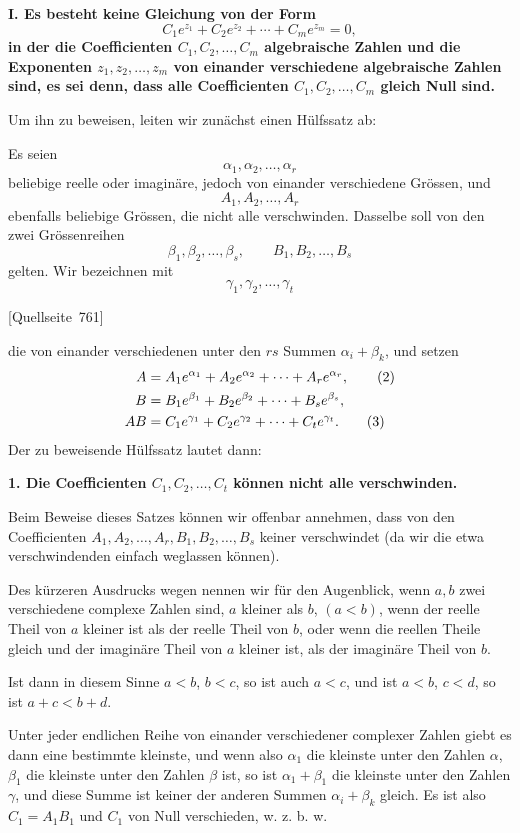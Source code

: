 \documentclass[11pt]{article}
\newcommand{\srcpage}[1]{\par\medskip\noindent\textsf{[Quellseite~#1]}\par\smallskip}
\begin{document}
\textbf{I. Es besteht keine Gleichung von der Form}
\begin{equation}\tag{1}
C_1e^{z_1}+C_2e^{z_2}+\cdots+C_me^{z_m}=0,
\end{equation}
\textbf{in der die Coefficienten $C_1,C_2,\ldots,C_m$ algebraische Zahlen und die Exponenten $z_1,z_2,\ldots,z_m$ von einander verschiedene algebraische Zahlen sind, es sei denn, dass alle Coefficienten $C_1,C_2,\ldots,C_m$ gleich Null sind.}

Um ihn zu beweisen, leiten wir zunächst einen Hülfssatz ab:

Es seien
\[
\alpha_1,\alpha_2,\ldots,\alpha_r
\]
beliebige reelle oder imaginäre, jedoch von einander verschiedene Grössen, und
\[
A_1,A_2,\ldots,A_r
\]
ebenfalls beliebige Grössen, die nicht alle verschwinden. Dasselbe soll von den zwei Grössenreihen
\[
\beta_1,\beta_2,\ldots,\beta_s,\qquad
B_1,B_2,\ldots,B_s
\]
gelten. Wir bezeichnen mit
\[
\gamma_1,\gamma_2,\ldots,\gamma_t
\]
\srcpage{761}
die von einander verschiedenen unter den $rs$ Summen $\alpha_i+\beta_k$, und setzen
\begin{align}
A&=A_1e^{\alpha_1}+A_2e^{\alpha_2}+\cdots+A_re^{\alpha_r},\tag{2}\\
B&=B_1e^{\beta_1}+B_2e^{\beta_2}+\cdots+B_se^{\beta_s},\notag\\
AB&=C_1e^{\gamma_1}+C_2e^{\gamma_2}+\cdots+C_te^{\gamma_t}.\tag{3}
\end{align}
Der zu beweisende Hülfssatz lautet dann:

\textbf{1. Die Coefficienten $C_1,C_2,\ldots,C_t$ können nicht alle verschwinden.}

Beim Beweise dieses Satzes können wir offenbar annehmen, dass von den Coefficienten $A_1,A_2,\ldots,A_r,B_1,B_2,\ldots,B_s$ keiner verschwindet (da wir die etwa verschwindenden einfach weglassen können).

Des kürzeren Ausdrucks wegen nennen wir für den Augenblick, wenn $a,b$ zwei verschiedene complexe Zahlen sind, $a$ kleiner als $b$, $(a<b)$, wenn der reelle Theil von $a$ kleiner ist als der reelle Theil von $b$, oder wenn die reellen Theile gleich und der imaginäre Theil von $a$ kleiner ist, als der imaginäre Theil von $b$.

Ist dann in diesem Sinne $a<b$, $b<c$, so ist auch $a<c$, und ist $a<b$, $c<d$, so ist $a+c<b+d$.

Unter jeder endlichen Reihe von einander verschiedener complexer Zahlen giebt es dann eine bestimmte kleinste, und wenn also $\alpha_1$ die kleinste unter den Zahlen $\alpha$, $\beta_1$ die kleinste unter den Zahlen $\beta$ ist, so ist $\alpha_1+\beta_1$ die kleinste unter den Zahlen $\gamma$, und diese Summe ist keiner der anderen Summen $\alpha_i+\beta_k$ gleich. Es ist also $C_1=A_1B_1$ und $C_1$ von Null verschieden, w. z. b. w.
\end{document}
